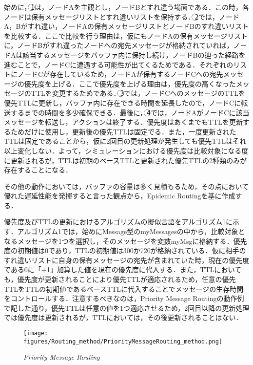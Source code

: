 \documentclass[11pt]{icsthesis}
\begin{document}
始めに，\textcircled{1}は，ノードAを主観とし，ノードBとすれ違う場面である．この時，各ノードは保有メッセージリストとすれ違いリストを保持する．\textcircled{2}では，ノードA，Bがすれ違い，ノードAの保有メッセージリストとノードBのすれ違いリストを比較する．ここで比較を行う理由は，仮にもノードAの保有メッセージリストに，ノードBがすれ違ったノードへの宛先メッセージが格納されていれば，ノードAは該当するメッセージをバッファ内に保持し続け，ノードBの辿った経路を進むことで，ノードCに遭遇する可能性が出てくるためである．それぞれのリストにノードCが存在しているため，ノードAが保有するノードCへの宛先メッセージの優先度を上げる．ここで優先度を上げる理由は，優先度の高くなったメッセージのTTLを変更するためである．\textcircled{3}では，ノードCへのメッセージのTTLを優先TTLに更新し，バッファ内に存在できる時間を延長したので，ノードCに転送するまでの時間を多少確保できる．最後に，\textcircled{4}では，ノードAがノードCに該当メッセージを転送し，アクションは終了する．優先度はあくまでもTTLを更新するためだけに使用し，更新後の優先TTLは固定でる．また，一度更新されたTTLは固定であることから，仮に2回目の更新処理が発生しても優先TTLはそれ以上変化しない．よって，シミュレーションにおける優先度は比較対象になる度に更新されるが，TTLは初期のベースTTLと更新された優先TTLの2種類のみが存在することになる．

その他の動作においては，バッファの容量は多く見積もるため，その点において優れた遅延性能を発揮すると言った観点から，Epidemic Routingを基に作成する．

優先度及びTTLの更新におけるアルゴリズムの擬似言語をアルゴリズム1に示す．アルゴリズム1では，始めにMessage型のmyMessagesの中から，比較対象となるメッセージを1つを選択し，そのメッセージを変数myMsgに格納する．優先度の初期値は0であり，TTLの初期値は300か720が格納されている．仮に相手のすれ違いリストに自身の保有メッセージの宛先が含まれていた時，現在の優先度である0に「+1」加算した値を現在の優先度に代入する．また，TTLにおいても，優先度が更新されることにより優先TTLが適応されるため，任意の優先TTLをTTLの初期値であるベースTTLに代入することでメッセージの生存時間をコントロールする．注意するべきなのは，Priority Message Routingの動作例で記した通り，優先TTLは任意の値を1つ適応させるため，2回目以降の更新処理では優先度は更新されるが，TTLにおいては，その後更新されることはない．

\begin{figure}[h]
	\centering
	\texttt{[image: figures/Routing\_method/PriorityMessageRouting\_method.png]}
	\caption[]{\it{Priority Message Routing}}
	\label{PriorityMessageRouting}
\end{figure}
\end{document}
